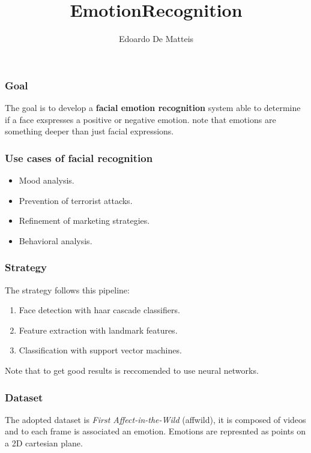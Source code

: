 \documentclass{beamer}
\title{EmotionRecognition}
\author{Edoardo De Matteis}
\institute[Sapienza Università di Roma Computer Science]
\begin{document}
\frame{\titlepage}

\begin{frame}
    \frametitle{Goal}
    The goal is to develop a \textbf{facial emotion recognition} system able to determine if a face exspresses a positive or negative emotion.
    note that emotions are something deeper than just facial expressions.
\end{frame}

\begin{frame}
    \frametitle{Use cases of facial recognition}
    \begin{itemize}
        \item Mood analysis.
        \item Prevention of terrorist attacks.
        \item Refinement of marketing strategies.
        \item Behavioral analysis.
    \end{itemize}
\end{frame}

\begin{frame}
    \frametitle{Strategy}
    The strategy follows this pipeline:
    \begin{enumerate}
        \item Face detection with haar cascade classifiers.
        \item Feature extraction with landmark features.
        \item Classification with support vector machines.
    \end{enumerate}
    Note that to get good results is reccomended to use neural networks.
\end{frame}

\begin{frame}
    \frametitle{Dataset}
    The adopted dataset is \textit{First Affect-in-the-Wild} (affwild), it is composed of videos and to each frame is associated an emotion. 
    Emotions are represnted as points on a 2D cartesian plane.
\end{frame}
\end{document}
